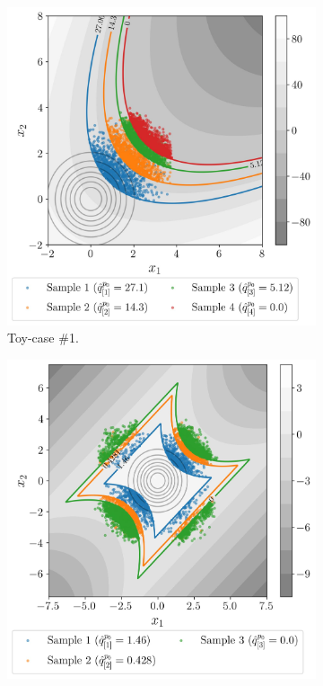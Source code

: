 \begin{figure}
    \centering
    \begin{subfigure}[b]{0.49\linewidth}
        \centering
        \includegraphics[width=\linewidth]{part3/figures/BANCS/bancs_parabolic.jpg}
        \caption{Toy-case \#1.}
    \end{subfigure}
    \begin{subfigure}[b]{0.49\linewidth}
        \centering
        \includegraphics[width=\linewidth]{part3/figures/BANCS/bancs_4branch.jpg}

\end{subfigure}
\end{figure}
